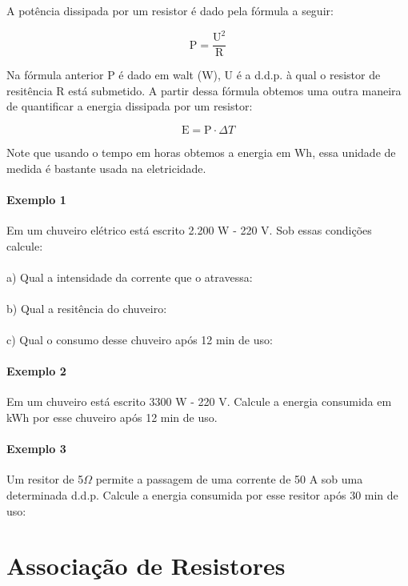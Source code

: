 \documentclass[12pt,a4paper]{book}
\begin{document}
A potência dissipada por um resistor é dado pela fórmula a seguir:

$$ \mathrm{P} = \frac{\mathrm{U}^2}{\mathrm{R}}$$

Na fórmula anterior P é dado em walt (W), U é a d.d.p. à qual o resistor de resitência R está submetido. A partir dessa fórmula obtemos uma outra maneira de quantificar a energia dissipada por um resistor:

$$ \mathrm{E} = \mathrm{P} \cdot \Delta T$$

Note que usando o tempo em horas obtemos a energia em Wh, essa unidade de medida é bastante usada na eletricidade.

			\paragraph{Exemplo 1} Em um chuveiro elétrico está escrito 2.200 W - 220 V. Sob essas condições calcule:
			\paragraph{} a) Qual a intensidade da corrente que o atravessa: 
			\paragraph{} b) Qual a resitência do chuveiro:
			\paragraph{} c) Qual o consumo desse chuveiro após 12 min de uso:			
			
			\paragraph{Exemplo 2} Em um chuveiro está escrito 3300 W - 220 V. Calcule a energia consumida em kWh por esse chuveiro após 12 min de uso.
			
			\paragraph{Exemplo 3} Um resitor de 5$\Omega$ permite a passagem de uma corrente de 50 A sob uma determinada d.d.p. Calcule a energia consumida por esse resitor após 30 min de uso:
			
	\section{Associação de Resistores}
\end{document}
